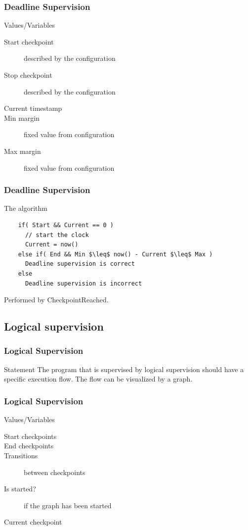 \documentclass{beamer}
\begin{document}
\begin{frame}
  \frametitle{Deadline Supervision}
  \begin{block}{Values/Variables}
    \begin{description}
      \item[Start checkpoint] described by the configuration
      \item[Stop checkpoint] described by the configuration
      \item[Current timestamp]
      \item[Min margin] fixed value from configuration
      \item[Max margin] fixed value from configuration
    \end{description}
  \end{block}
\end{frame}

\begin{frame}[fragile]
  \frametitle{Deadline Supervision}
  \begin{block}{The algorithm}
    \begin{lstlisting}
    if( Start && Current == 0 )
      // start the clock
      Current = now()
    else if( End && Min $\leq$ now() - Current $\leq$ Max )
      Deadline supervision is correct
    else
      Deadline supervision is incorrect
    \end{lstlisting}
  \end{block}
  Performed by CheckpointReached.
\end{frame}

\subsection{Logical supervision}
\begin{frame}
  \frametitle{Logical Supervision}
  \begin{block}{Statement}
    The program that is supervised by logical supervision should have
    a specific execution flow. The flow can be visualized by a
    graph.
  \end{block}
\end{frame}

\begin{frame}
  \frametitle{Logical Supervision}
  \begin{block}{Values/Variables}
    \begin{description}
      \item[Start checkpoints]
      \item[End checkpoints]
      \item[Transitions] between checkpoints
      \item[Is started?] if the graph has been started
      \item[Current checkpoint]
    \end{description}
  \end{block}
\end{frame}
\end{document}
